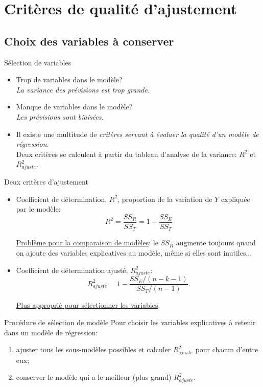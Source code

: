\documentclass{BeamerTemplate}
\begin{document}
\section[Qualité]{Critères de qualité d'ajustement}

\subsection{Choix des variables à conserver}

\begin{frame}[t]{Sélection de variables }

{\small
\begin{itemize}\itemsep7mm
\item Trop de variables dans le modèle? \\{\it La variance des prévisions est trop grande. }
\item Manque de variables dans le modèle? \\{\it Les prévisions sont biaisées. }
\item Il existe  une multitude de \textit{critères servant à évaluer la qualité d'un modèle de régression}. \\ Deux critères se calculent à partir du tableau d'analyse de la variance: $R^2$ et $R^2_{ajuste}$.
\end{itemize}
}
\end{frame}

\begin{frame}[t]{Deux critères d'ajustement }

{\small
\begin{itemize}
\item<1-> \alert{Coefficient de détermination, $R^2$, proportion de la variation de $Y$ expliquée par le modèle}: $$R^2=\frac{SS_R}{SS_T}=1-\frac{SS_E}{SS_T}$$

    \underline{Problème pour la comparaison de modèles}: le $SS_R$ augmente toujours quand on ajoute des variables explicatives au modèle, même si elles sont inutiles...

\item<2-> \alert{Coefficient de détermination ajusté, $R^2_{ajuste}$}:
$$R^2_{ajuste}=1-\dfrac{SS_E/(n-k-1)}{SS_T/(n-1)}.$$

\underline{Plus approprié pour sélectionner les variables}.
\end{itemize}
}
\end{frame}

\begin{frame}[t]{Procédure de sélection de modèle}
Pour choisir les variables explicatives à retenir dans un modèle de régression:\\

\bigskip
\begin{enumerate}\itemsep5mm
\item ajuster tous les sous-modèles possibles et calculer $R^2_{ajuste}$ pour chacun d'entre eux;
\item conserver le modèle qui a le meilleur (\alert{plus grand}) $R^2_{ajuste}$.
\end{enumerate}
\end{frame}
\end{document}
